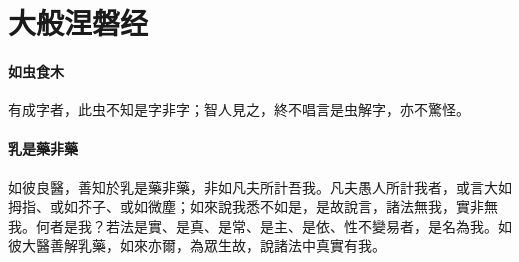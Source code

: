 \section{大般涅磐经}

\paragraph{如虫食木}
有成字者，此虫不知是字非字；智人見之，終不唱言是虫解字，亦不驚怪。
\paragraph{乳是藥非藥}
如彼良醫，善知於乳是藥非藥，非如凡夫所計吾我。凡夫愚人所計我者，或言大如拇指、或如芥子、或如微塵；如來說我悉不如是，是故說言，諸法無我，實非無我。何者是我？若法是實、是真、是常、是主、是依、性不變易者，是名為我。如彼大醫善解乳藥，如來亦爾，為眾生故，說諸法中真實有我。
